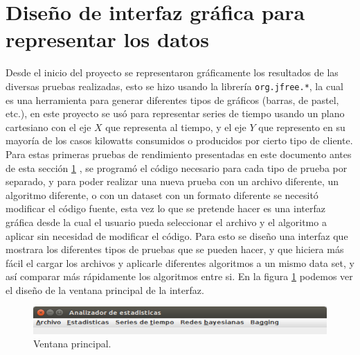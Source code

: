 \section{Diseño de interfaz gráfica para representar los datos} \label{sec:disInterfaz}
Desde el inicio del proyecto se representaron gráficamente los resultados de las diversas pruebas realizadas, esto se hizo usando la librería \texttt{org.jfree.*}, la cual es una herramienta para generar diferentes tipos de gráficos (barras, de pastel, etc.), en este proyecto se usó para representar series de tiempo usando un plano cartesiano con el eje $X$ que representa al tiempo, y el eje $Y$ que represento en su mayoría de los casos kilowatts consumidos o producidos por cierto tipo de cliente. 
Para estas primeras pruebas de rendimiento presentadas en este documento antes de esta sección \ref{sec:disInterfaz}
, se programó el código necesario para cada tipo de prueba por separado, y para poder realizar una nueva prueba con un archivo diferente, un algoritmo diferente, o con un dataset con un formato diferente se necesitó modificar el código fuente, esta vez lo que se pretende hacer es una interfaz gráfica desde la cual el usuario pueda seleccionar el archivo y el algoritmo a aplicar sin necesidad de modificar el código.
Para esto se diseño una interfaz que mostrara los diferentes tipos de pruebas que se pueden hacer, y que hiciera más fácil el cargar los archivos y aplicarle diferentes algoritmos a un mismo data set, y así comparar más rápidamente los algoritmos entre si.
En la figura \ref{fig:ventanaPrincipal} podemos ver el diseño de la ventana principal de la interfaz. 
\begin{figure}[h]
	\centering
	\includegraphics[width=12cm]{img/ventanaPrincipal.png}
	\caption{Ventana principal.}
	\label{fig:ventanaPrincipal}
\end{figure}


